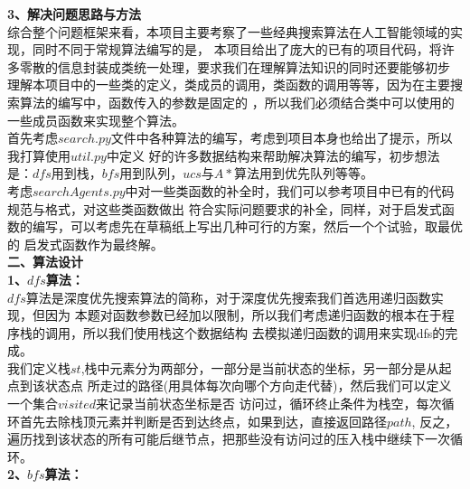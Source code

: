 \documentclass[a4paper,12pt,UTF8]{article}
\begin{document}
\begin{flushleft}
{{        
    }
    \large{
        \hspace{1cm}\textbf{3、解决问题思路与方法\\}
    }
    \normalsize{
        \hspace{1cm}综合整个问题框架来看，本项目主要考察了一些经典搜索算法在人工智能领域的实现，同时不同于常规算法编写的是，
        本项目给出了庞大的已有的项目代码，将许多零散的信息封装成类统一处理，要求我们在理解算法知识的同时还要能够初步
        理解本项目中的一些类的定义，类成员的调用，类函数的调用等等，因为在主要搜索算法的编写中，函数传入的参数是固定的
        ，所以我们必须结合类中可以使用的一些成员函数来实现整个算法。\\
        \hspace{1cm}首先考虑$search.py$文件中各种算法的编写，考虑到项目本身也给出了提示，所以我打算使用$util.py$中定义
        好的许多数据结构来帮助解决算法的编写，初步想法是：$dfs$用到栈，$bfs$用到队列，$ucs$与$A*$算法用到优先队列等等。\\
        \hspace{1cm}考虑$searchAgents.py$中对一些类函数的补全时，我们可以参考项目中已有的代码规范与格式，对这些类函数做出
        符合实际问题要求的补全，同样，对于启发式函数的编写，可以考虑先在草稿纸上写出几种可行的方案，然后一个个试验，取最优的
        启发式函数作为最终解。\\
    }
    \Large{
        \textbf{
            二、算法设计\\
        }
    }
    \large{
        \hspace{1cm}\textbf{1、$dfs$算法：\\}
    }
    \normalsize{
        \hspace{1cm}$dfs$算法是深度优先搜索算法的简称，对于深度优先搜索我们首选用递归函数实现，但因为
        本题对函数参数已经加以限制，所以我们考虑递归函数的根本在于程序栈的调用，所以我们使用栈这个数据结构
        去模拟递归函数的调用来实现dfs的完成。\\
        \hspace{1cm}我们定义栈$st$,栈中元素分为两部分，一部分是当前状态的坐标，另一部分是从起点到该状态点
        所走过的路径(用具体每次向哪个方向走代替)，然后我们可以定义一个集合$visited$来记录当前状态坐标是否
        访问过，循环终止条件为栈空，每次循环首先去除栈顶元素并判断是否到达终点，如果到达，直接返回路径$path$,
        反之，遍历找到该状态的所有可能后继节点，把那些没有访问过的压入栈中继续下一次循环。\\
    }
    \large{
        \hspace{1cm}\textbf{2、$bfs$算法：\\}
}}
\end{flushleft}
\end{document}
